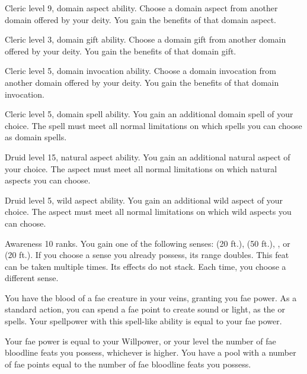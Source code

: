 \featpres Cleric level 9, domain aspect ability.
\featben Choose a domain aspect from another domain offered by your deity.
You gain the benefits of that domain aspect.

\featpres Cleric level 3, domain gift ability.
\featben Choose a domain gift from another domain offered by your deity.
You gain the benefits of that domain gift.

\featpres Cleric level 5, domain invocation ability.
\featben Choose a domain invocation from another domain offered by your deity.
You gain the benefits of that domain invocation.

\featpres Cleric level 5, domain spell ability.
\featben You gain an additional domain spell of your choice.
The spell must meet all normal limitations on which spells you can choose as domain spells.

\featpres Druid level 15, natural aspect ability.
\featben You gain an additional natural aspect of your choice.
The aspect must meet all normal limitations on which natural aspects you can choose.

\featpres Druid level 5, wild aspect ability.
\featben You gain an additional wild aspect of your choice.
The aspect must meet all normal limitations on which wild aspects you can choose.

\featpre Awareness 10 ranks.
\featben You gain one of the following senses:  (20 ft.),  (50 ft.), , or  (20 ft.).
If you choose a sense you already possess, its range doubles.
 This feat can be taken multiple times.
Its effects do not stack.
Each time, you choose a different sense.

\featben You have the blood of a fae creature in your veins, granting you fae power.
As a standard action, you can spend a fae point to create sound or light, as the  or  spells.
Your spellpower with this spell-like ability is equal to your fae power.

Your fae power is equal to your Willpower, or your level \add the number of fae bloodline feats you possess, whichever is higher.
You have a pool with a number of fae points equal to the number of fae bloodline feats you possess.

